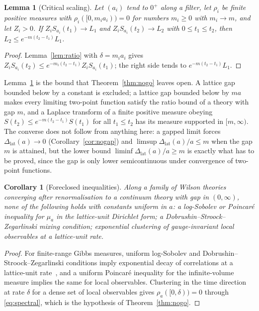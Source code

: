 \documentclass[aps,prd,twocolumn,superscriptaddress,nofootinbib,floatfix]{revtex4-2}
\newtheorem{lemma}[theorem]{Lemma}
\newtheorem{corollary}[theorem]{Corollary}
\theoremstyle{definition}
\theoremstyle{remark}
\newcommand{\Dlat}{\Delta_{\mathrm{lat}}}
\begin{document}
\begin{lemma}[Critical scaling]
\label{lem:critical}
Let $(a_i)$ tend to $0^+$ along a filter, let $\rho_i$ be finite positive
measures with $\rho_i([0,m_ia_i))=0$ for numbers $m_i\ge0$ with $m_i\to m$,
and let $Z_i>0$. If $Z_iS_{a_i}(t_1)\to L_1$ and $Z_iS_{a_i}(t_2)\to L_2$ with
$0\le t_1\le t_2$, then $L_2\le e^{-m(t_2-t_1)}L_1$.
\end{lemma}

\begin{proof}
Lemma~\ref{lem:ratio} with $\delta=m_ia_i$ gives
$Z_iS_{a_i}(t_2)\le e^{-m_i(t_2-t_1)}Z_iS_{a_i}(t_1)$; the right side tends
to $e^{-m(t_2-t_1)}L_1$.
\end{proof}

Lemma~\ref{lem:critical} is the bound that Theorem~\ref{thm:nogo} leaves
open. A lattice gap bounded below by a constant is excluded; a lattice gap
bounded below by $ma$ makes every limiting two-point function satisfy the
ratio bound of a theory with gap $m$, and a Laplace transform of a finite
positive measure obeying $S(t_2)\le e^{-m(t_2-t_1)}S(t_1)$ for all
$t_1\le t_2$ has its measure supported in $[m,\infty)$. The converse does
not follow from anything here: a gapped limit forces $\Dlat(a)\to0$
(Corollary~\ref{cor:nogap}) and $\limsup\Dlat(a)/a\le m$ when the gap $m$
is attained, but the lower bound $\liminf\Dlat(a)/a\ge m$ is exactly what
has to be proved, since the gap is only lower semicontinuous under
convergence of two-point functions.

\begin{corollary}[Foreclosed inequalities]
\label{cor:strategy}
Along a family of Wilson theories converging after renormalisation to a
continuum theory with gap in $(0,\infty)$, none of the following holds
with constants uniform in $a$: a log-Sobolev or Poincar\'e inequality for
$\mu_a$ in the lattice-unit Dirichlet form; a Dobrushin--Stroock--Zegarlinski
mixing condition; exponential clustering of gauge-invariant local
observables at a lattice-unit rate.
\end{corollary}

\begin{proof}
For finite-range Gibbs measures, uniform log-Sobolev and
Dobrushin--Stroock--Zegarlinski conditions imply exponential decay of
correlations at a lattice-unit rate~\cite{SZ92}, and a uniform Poincar\'e
inequality for the infinite-volume measure implies the same for local
observables. Clustering in the time direction at rate $\delta$ for a dense
set of local observables gives $\rho_a([0,\delta))=0$ through
\eqref{eq:spectral}, which is the hypothesis of Theorem~\ref{thm:nogo}.
\end{proof}
\end{document}

